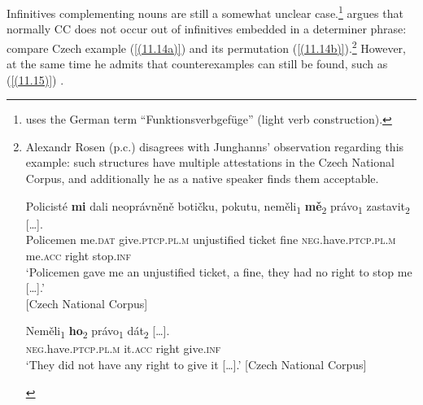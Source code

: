 Infinitives complementing nouns are still a somewhat unclear case.\footnote{\citet[73]{Junghanns02} uses the German term “Funktionsverbgefüge” (light verb construction).} \citet[72]{Junghanns02} argues that normally CC does not occur out of infinitives embedded in a determiner phrase: compare Czech example (\ref{(11.14a)}) and its permutation (\ref{(11.14b)}).\footnote{Alexandr Rosen (p.c.) disagrees with Junghanns’ observation regarding this example: such structures have multiple attestations in the Czech National Corpus, and additionally he as a native speaker finds them acceptable.
	
\begin{exe}\ex\label{(11.16)}
\gll Policisté \textbf{mi} dali neoprávněně botičku, pokutu, neměli\textsubscript{1} \textbf{mě}\textsubscript{2} právo\textsubscript{1} {zastavit\textsubscript{2} [\dots].} \\
 Policemen me.\textsc{dat} give.\textsc{ptcp}.\textsc{pl}.\textsc{m} unjustified ticket fine \textsc{neg}.have.\textsc{ptcp}.\textsc{pl}.\textsc{m} me.\textsc{acc} right stop.\textsc{inf} \\
\glt ‘Policemen gave me an unjustified ticket, a fine, they had no right to stop me [\dots].’  \\
\hfill [Czech National Corpus]

\ex\label{(11.17)}
\gll Neměli\textsubscript{1} \textbf{ho}\textsubscript{2} právo\textsubscript{1} {dát\textsubscript{2} [\dots].} \\
 \textsc{neg}.have.\textsc{ptcp}.\textsc{pl}.\textsc{m} it.\textsc{acc} right give.\textsc{inf} \\
\glt ‘They did not have any right to give it [\dots].’
\hfill [Czech National Corpus]
\end{exe}} However, at the same time he admits that counterexamples can still be found, such as (\ref{(11.15)}) \citep[cf.][73]{Junghanns02}. 


